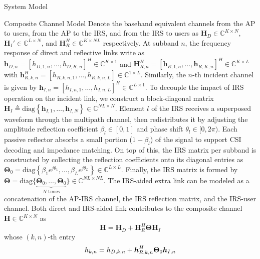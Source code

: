 \documentclass{IEEEtran}
\begin{document}
\begin{section}{System Model}
	\begin{subsection}{Composite Channel Model}
		Denote the baseband equivalent channels from the AP to users, from the AP to the IRS, and from the IRS to users as $\boldsymbol{H}_D \in \mathbb{C}^{K \times N}$, $\boldsymbol{H}_I' \in \mathbb{C}^{L \times N}$, and $\boldsymbol{H}_R^H \in \mathbb{C}^{K \times NL}$ respectively. At subband $n$, the frequency response of direct and reflective links write as $\boldsymbol{h}_{D,n}=[h_{D,1,n},\dots,h_{D,K,n}]^H \in \mathbb{C}^{K \times 1}$ and $\boldsymbol{H}_{R,n}^H=[\boldsymbol{h}_{R,1,n},\dots,\boldsymbol{h}_{R,K,n}]^H \in \mathbb{C}^{K \times L}$ with $\boldsymbol{h}_{R,k,n}^H=[h_{R,k,n,1},\dots,h_{R,k,n,L}] \in \mathbb{C}^{1 \times L}$. Similarly, the $n$-th incident channel is given by $\boldsymbol{h}_{I,n}=[h_{I,n,1},\dots,h_{I,n,L}]^H \in \mathbb{C}^{L \times 1}$. To decouple the impact of IRS operation on the incident link, we construct a block-diagonal matrix $\boldsymbol{H}_I \triangleq \mathrm{diag}\left\{\boldsymbol{h}_{I,1},\dots,\boldsymbol{h}_{I,N}\right\} \in \mathbb{C}^{NL \times N}$. Element $l$ of the IRS receives a superposed waveform through the multipath channel, then redistributes it by adjusting the amplitude reflection coefficient $\beta_l \in [0,1]$ and phase shift $\theta_l \in [0,2\pi)$. Each passive reflector absorbs a small portion ($1 - \beta_l$) of the signal to support CSI decoding and impedance matching. On top of this, the IRS matrix per subband is constructed by collecting the reflection coefficients onto its diagonal entries as $\boldsymbol{\Theta}_0 = \mathrm{diag}\left\{\beta_1 e^{j \theta_1}, \dots, \beta_L e^{j \theta_L}\right\} \in \mathbb{C}^{L \times L}$. Finally, the IRS matrix is formed by $\boldsymbol{\Theta} = \mathrm{diag}\{\underbrace{\boldsymbol{\Theta}_0,\dots,\boldsymbol{\Theta}_0}_{N\text{ times}}\} \in \mathbb{C}^{NL \times NL}$. The IRS-aided extra link can be modeled as a concatenation of the AP-IRS channel, the IRS reflection matrix, and the IRS-user channel. Both direct and IRS-aided link contributes to the composite channel $\boldsymbol{H} \in \mathbb{C}^{K \times N}$ as
		\begin{equation}\label{eq:H}
			\boldsymbol{H} = \boldsymbol{H}_D+\boldsymbol{H}_R^H\boldsymbol{\Theta}\boldsymbol{H}_I
		\end{equation}
		whose $(k,n)$-th entry
		\begin{equation}\label{eq:h_{k,n}}
			h_{k,n}=h_{D,k,n}+\boldsymbol{h}_{R,k,n}^H\boldsymbol{\Theta}_0\boldsymbol{h}_{I,n}
		\end{equation}

\end{subsection}
\end{section}
\end{document}
